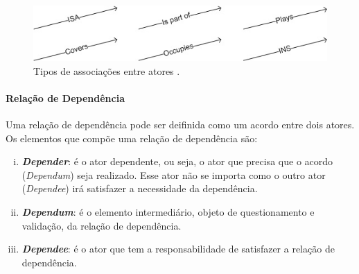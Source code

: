                 \begin{figure}[h!]
                    \centering
                        \includegraphics[width=0.8\linewidth]{Figuras/istar/actor-associations.jpg}
                        \caption{Tipos de associações entre atores \cite{site2013iwiki}.}
                        \label{fig:associations}
                \end{figure}

            \paragraph{Relação de Dependência}
                Uma relação de dependência pode ser deifinida como um acordo entre dois atores.
                Os elementos que compõe uma relação de dependência são:
                \begin{enumerate}[i.]
                    \item \emph{\textbf{Depender}}: é o ator dependente, ou seja, o ator que precisa que o acordo (\emph{Dependum}) seja realizado. Esse ator não se importa como o outro ator (\emph{Dependee}) irá satisfazer a necessidade da dependência.
                    \item \emph{\textbf{Dependum}}: é o elemento intermediário, objeto de questionamento e validação, da relação de dependência. %
                    \item \emph{\textbf{Dependee}}: é o ator que tem a responsabilidade de satisfazer a relação de dependência.
                \end{enumerate}

